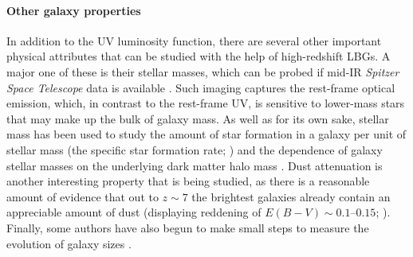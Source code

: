 \paragraph{Other galaxy properties}
In addition to the UV luminosity function, there are several other important physical attributes that can be studied with the help of high-redshift LBGs. A major one of these is their stellar masses, which can be probed if mid-IR \textit{Spitzer Space Telescope} data is available  \citep{2006ApJ...651...24Y,2009ApJ...697.1493S,2010ApJ...719.1250F,2011ApJ...735L..34G}. Such imaging captures the rest-frame optical emission, which, in contrast to the rest-frame UV, is sensitive to lower-mass stars that may make up the bulk of galaxy mass. As well as for its own sake, stellar mass has been used to study the amount of star formation in a galaxy per unit of stellar mass (the specific star formation rate; \citealt{2013ApJ...763..129S,2014ApJ...781...34G,2015ApJ...799..183S}) and the dependence of galaxy stellar masses on the underlying dark matter halo mass \citep{2009MNRAS.395.2196M,2013ApJ...770...57B,2015ApJ...814...95F}. Dust attenuation is another interesting property that is being studied, as there is a reasonable amount of evidence that out to $z\sim7$ the brightest galaxies already contain an appreciable amount of dust (displaying reddening of $E(B-V)\sim 0.1\text{--}0.15$; \citealt{2012ApJ...754...83B,2014ApJ...793..115B,2012ApJ...756..164F,2014MNRAS.440.3714R,2015ApJ...814...95F}). Finally, some authors have also begun to make small steps to measure the evolution of galaxy sizes \citep{2010ApJ...709L..21O,2013ApJ...765...68H,2013AJ....145....4W,2014MNRAS.440.2810B}. \par

